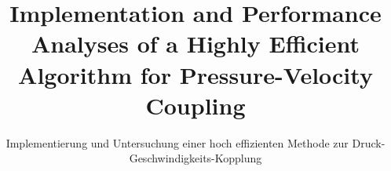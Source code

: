 \documentclass[article,type=msc,colorback,accentcolor=tud2a]{tudreport}
\begin{document}
\title{Implementation and Performance Analyses of a Highly Efficient Algorithm for Pressure-Velocity Coupling}
\subtitle{Implementierung und Untersuchung einer hoch effizienten Methode zur Druck-Geschwindigkeits-Kopplung}
  \maketitle
  
  
  \tableofcontents
  \listoffigures
  \listoftables
  \listofalgorithms



\end{document}
